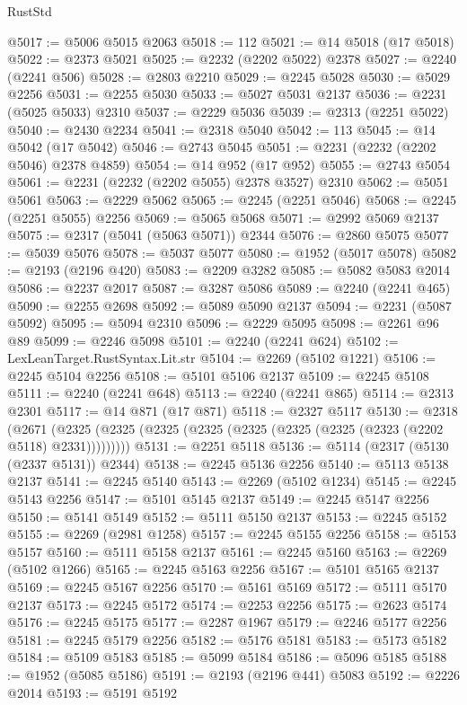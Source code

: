\begin{lexlean}{RustStd}
\begin{coremodule}
@5017 := @5006 @5015 @2063
@5018 := 112
@5021 := @14 @5018 (@17 @5018)
@5022 := @2373 @5021
@5025 := @2232 (@2202 @5022) @2378
@5027 := @2240 (@2241 @506)
@5028 := @2803 @2210
@5029 := @2245 @5028
@5030 := @5029 @2256
@5031 := @2255 @5030
@5033 := @5027 @5031 @2137
@5036 := @2231 (@5025 @5033) @2310
@5037 := @2229 @5036
@5039 := @2313 (@2251 @5022)
@5040 := @2430 @2234
@5041 := @2318 @5040
@5042 := 113
@5045 := @14 @5042 (@17 @5042)
@5046 := @2743 @5045
@5051 := @2231 (@2232 (@2202 @5046) @2378 @4859)
@5054 := @14 @952 (@17 @952)
@5055 := @2743 @5054
@5061 := @2231 (@2232 (@2202 @5055) @2378 @3527) @2310
@5062 := @5051 @5061
@5063 := @2229 @5062
@5065 := @2245 (@2251 @5046)
@5068 := @2245 (@2251 @5055) @2256
@5069 := @5065 @5068
@5071 := @2992 @5069 @2137
@5075 := @2317 (@5041 (@5063 @5071)) @2344
@5076 := @2860 @5075
@5077 := @5039 @5076
@5078 := @5037 @5077
@5080 := @1952 (@5017 @5078)
@5082 := @2193 (@2196 @420)
@5083 := @2209 @3282
@5085 := @5082 @5083 @2014
@5086 := @2237 @2017
@5087 := @3287 @5086
@5089 := @2240 (@2241 @465)
@5090 := @2255 @2698
@5092 := @5089 @5090 @2137
@5094 := @2231 (@5087 @5092)
@5095 := @5094 @2310
@5096 := @2229 @5095
@5098 := @2261 @96 @89
@5099 := @2246 @5098
@5101 := @2240 (@2241 @624)
@5102 := LexLeanTarget.RustSyntax.Lit.str
@5104 := @2269 (@5102 @1221)
@5106 := @2245 @5104 @2256
@5108 := @5101 @5106 @2137
@5109 := @2245 @5108
@5111 := @2240 (@2241 @648)
@5113 := @2240 (@2241 @865)
@5114 := @2313 @2301
@5117 := @14 @871 (@17 @871)
@5118 := @2327 @5117
@5130 := @2318
    (@2671 (@2325 (@2325 (@2325 (@2325 (@2325 (@2325 (@2325 (@2323 (@2202 @5118) @2331)))))))))
@5131 := @2251 @5118
@5136 := @5114 (@2317 (@5130 (@2337 @5131)) @2344)
@5138 := @2245 @5136 @2256
@5140 := @5113 @5138 @2137
@5141 := @2245 @5140
@5143 := @2269 (@5102 @1234)
@5145 := @2245 @5143 @2256
@5147 := @5101 @5145 @2137
@5149 := @2245 @5147 @2256
@5150 := @5141 @5149
@5152 := @5111 @5150 @2137
@5153 := @2245 @5152
@5155 := @2269 (@2981 @1258)
@5157 := @2245 @5155 @2256
@5158 := @5153 @5157
@5160 := @5111 @5158 @2137
@5161 := @2245 @5160
@5163 := @2269 (@5102 @1266)
@5165 := @2245 @5163 @2256
@5167 := @5101 @5165 @2137
@5169 := @2245 @5167 @2256
@5170 := @5161 @5169
@5172 := @5111 @5170 @2137
@5173 := @2245 @5172
@5174 := @2253 @2256
@5175 := @2623 @5174
@5176 := @2245 @5175
@5177 := @2287 @1967
@5179 := @2246 @5177 @2256
@5181 := @2245 @5179 @2256
@5182 := @5176 @5181
@5183 := @5173 @5182
@5184 := @5109 @5183
@5185 := @5099 @5184
@5186 := @5096 @5185
@5188 := @1952 (@5085 @5186)
@5191 := @2193 (@2196 @441) @5083
@5192 := @2226 @2014
@5193 := @5191 @5192

\end{coremodule}
\end{lexlean}
